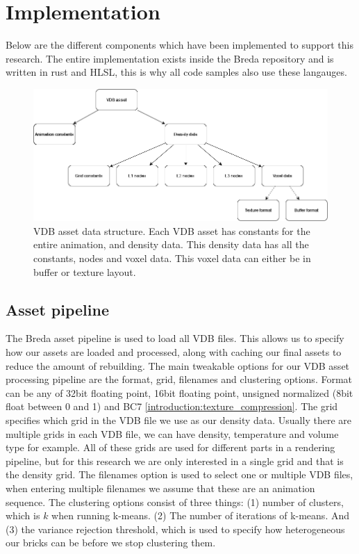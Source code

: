 \section{Implementation} \label{implementation}
Below are the different components which have been implemented to support this research. The entire implementation exists inside the Breda repository and is written in rust and HLSL, this is why all code samples also use these langauges.

\begin{figure}
    \centering
    \includegraphics[width=\linewidth]{figures/vdb_asset.png}
    \caption{VDB asset data structure. Each VDB asset has constants for the entire animation, and density data. This density data has all the constants, nodes and voxel data. This voxel data can either be in buffer or texture layout. }
    \label{fig:vdb_asset}
\end{figure}

\subsection{Asset pipeline} \label{implementation:asset_pipeline}
The Breda asset pipeline is used to load all VDB files. This allows us to specify how our assets are loaded and processed, along with caching our final assets to reduce the amount of rebuilding. The main tweakable options for our VDB asset processing pipeline are the format, grid, filenames and clustering options. Format can be any of 32bit floating point, 16bit floating point, unsigned normalized (8bit float between 0 and 1) and BC7 \ref{introduction:texture_compression}. The grid specifies which grid in the VDB file we use as our density data. Usually there are multiple grids in each VDB file, we can have density, temperature and volume type for example. All of these grids are used for different parts in a rendering pipeline, but for this research we are only interested in a single grid and that is the density grid. The filenames option is used to select one or multiple VDB files, when entering multiple filenames we assume that these are an animation sequence. The clustering options consist of three things: (1) number of clusters, which is $k$ when running k-means. (2) The number of iterations of k-means. And (3) the variance rejection threshold, which is used to specify how heterogeneous our bricks can be before we stop clustering them.

